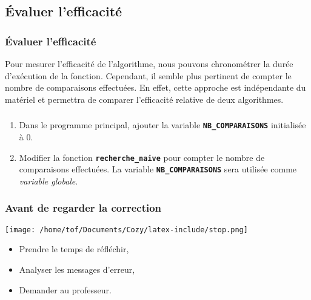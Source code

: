 \documentclass[svgnames,11pt]{beamer}
\begin{document}
\subsection{Évaluer l'efficacité}
\begin{frame}
    \frametitle{Évaluer l'efficacité}
Pour mesurer l'efficacité de l'algorithme, nous pouvons chronométrer la durée d'exécution de la fonction. Cependant, il semble plus pertinent de compter le nombre de comparaisons effectuées. En effet, cette approche est indépendante du matériel et permettra de comparer l'efficacité relative de deux algorithmes.
    

\end{frame}
\begin{frame}
    \frametitle{}

    \begin{activite}
    \begin{enumerate}
        \item Dans le programme principal, ajouter la variable \textbf{\texttt{NB\_COMPARAISONS}} initialisée à 0.
        \item Modifier la fonction \textbf{\texttt{recherche\_naive}} pour compter le nombre de comparaisons effectuées. La variable \textbf{\texttt{NB\_COMPARAISONS}} sera utilisée comme \emph{variable globale}.
    \end{enumerate}
    \end{activite}

\end{frame}
\begin{frame}
    \frametitle{Avant de regarder la correction}
\begin{center}
    \centering
    \texttt{[image: /home/tof/Documents/Cozy/latex-include/stop.png]}
    \end{center}
{\Large
    \begin{itemize}
        \item Prendre le temps de réfléchir,
        \item Analyser les messages d'erreur,
        \item Demander au professeur.
    \end{itemize}
}
\end{frame}
\end{document}
